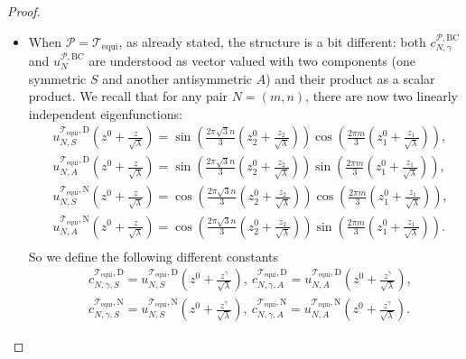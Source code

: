 \documentclass{amsart}
\theoremstyle{definition}
\theoremstyle{remark}
\numberwithin{equation}{section}
\theoremstyle{definition}
\theoremstyle{remark}
\begin{document}
\begin{proof}
\begin{itemize}
		\item  When $\mathcal{P}=	\mathcal{T}_\mathrm{equi}$, as already stated, the structure is a bit different: both $c_{N,\gamma}^{\mathcal{P},\mathrm{BC}}$ and $u_N^{\mathcal{P},\mathrm{BC}}$ are understood as vector valued with two components (one symmetric $S$ and another antisymmetric $A$) and their product as a scalar product. We recall that for any pair $N=(m,n)$, there are now two linearly independent eigenfunctions:
		\begin{equation}
			\begin{aligned}
				&u^{	\mathcal{T}_\mathrm{equi},\mathrm{D}}_{N,S}\left(z^0+\frac{z}{\sqrt{\lambda}}\right)=\sin\left(\frac{2\pi\sqrt{3}n}{3}\left(z^0_2+\frac{z_2}{\sqrt{\lambda}}\right)\right)\cos\left(\frac{2\pi m}{3}\left(z^0_1+\frac{z_1}{\sqrt{\lambda}}\right)\right),\\
				&u^{	\mathcal{T}_\mathrm{equi},\mathrm{D}}_{N,A}\left(z^0+\frac{z}{\sqrt{\lambda}}\right)=\sin\left(\frac{2\pi\sqrt{3}n}{3}\left(z^0_2+\frac{z_2}{\sqrt{\lambda}}\right)\right)\sin\left(\frac{2\pi m}{3}\left(z^0_1+\frac{z_1}{\sqrt{\lambda}}\right)\right),\\
				&u^{	\mathcal{T}_\mathrm{equi},\mathrm{N}}_{N,S}\left(z^0+\frac{z}{\sqrt{\lambda}}\right)=\cos\left(\frac{2\pi\sqrt{3}n}{3}\left(z^0_2+\frac{z_2}{\sqrt{\lambda}}\right)\right)\cos\left(\frac{2\pi m}{3}\left(z^0_1+\frac{z_1}{\sqrt{\lambda}}\right)\right),\\
				&u^{	\mathcal{T}_\mathrm{equi},\mathrm{N}}_{N,A}\left(z^0+\frac{z}{\sqrt{\lambda}}\right)=\cos\left(\frac{2\pi\sqrt{3}n}{3}\left(z^0_2+\frac{z_2}{\sqrt{\lambda}}\right)\right)\sin\left(\frac{2\pi m}{3}\left(z^0_1+\frac{z_1}{\sqrt{\lambda}}\right)\right).\\
			\end{aligned}
		\end{equation} So we define the following different constants
		\begin{equation}
			\begin{aligned}
				&c_{N,\gamma,S}^{	\mathcal{T}_\mathrm{equi},\mathrm{D}}=u^{	\mathcal{T}_\mathrm{equi},\mathrm{D}}_{N,S}\left(z^0+\frac{z^\gamma}{\sqrt{\lambda}}\right),\ c_{N,\gamma,A}^{	\mathcal{T}_\mathrm{equi},\mathrm{D}}=u^{	\mathcal{T}_\mathrm{equi},\mathrm{D}}_{N,A}\left(z^0+\frac{z^\gamma}{\sqrt{\lambda}}\right),\\
				&c_{N,\gamma,S}^{	\mathcal{T}_\mathrm{equi},\mathrm{N}}=u^{	\mathcal{T}_\mathrm{equi},\mathrm{N}}_{N,S}\left(z^0+\frac{z^\gamma}{\sqrt{\lambda}}\right),\ c_{N,\gamma,A}^{	\mathcal{T}_\mathrm{equi},\mathrm{N}}=u^{	\mathcal{T}_\mathrm{equi},\mathrm{N}}_{N,A}\left(z^0+\frac{z^\gamma}{\sqrt{\lambda}}\right).

\end{aligned}
\end{equation}
\end{itemize}
\end{proof}
\end{document}
